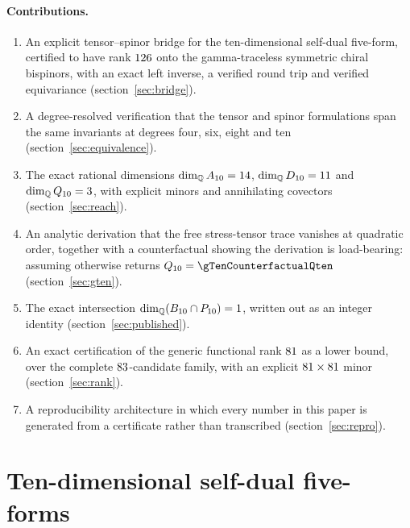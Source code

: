 \documentclass[11pt,a4paper]{article}
\theoremstyle{definition}
\theoremstyle{remark}
\newcommand{\Ften}{A_{10}}
\newcommand{\Dten}{D_{10}}
\newcommand{\Qten}{Q_{10}}
\newcommand{\Bten}{B_{10}}
\newcommand{\Pten}{P_{10}}
\newcommand{\Q}{\mathbb{Q}}
\begin{document}
\paragraph{Contributions.}
\begin{enumerate}\itemsep2pt
\item An explicit tensor--spinor bridge for the ten-dimensional self-dual
five-form, certified to have rank $126$ onto the gamma-traceless
symmetric chiral bispinors, with an exact left inverse, a verified round trip and
verified equivariance (section~\ref{sec:bridge}).
\item A degree-resolved verification that the tensor and spinor formulations span
the same invariants at degrees four, six, eight and ten
(section~\ref{sec:equivalence}).
\item The exact rational dimensions
$\dim_\Q \Ften = \dimAtenQ$, $\dim_\Q \Dten = \dimDtenQ$ and
$\dim_\Q \Qten = \dimQtenQ$, with explicit minors and annihilating covectors
(section~\ref{sec:reach}).
\item An analytic derivation that the free stress-tensor trace vanishes at
quadratic order, together with a counterfactual showing the derivation is
load-bearing: assuming otherwise returns $\Qten = \gTenCounterfactualQten$
(section~\ref{sec:gten}).
\item The exact intersection $\dim_\Q(\Bten \cap \Pten) = \dimBcapP$, written out
as an integer identity (section~\ref{sec:published}).
\item An exact certification of the generic functional rank
$81$ as a lower bound, over the complete
$83$-candidate family, with an explicit
$81\times81$ minor (section~\ref{sec:rank}).
\item A reproducibility architecture in which every number in this paper is
generated from a certificate rather than transcribed
(section~\ref{sec:repro}).
\end{enumerate}

\section{Ten-dimensional self-dual five-forms}
\label{sec:setup}
\end{document}
